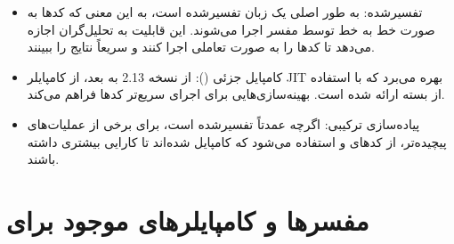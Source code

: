 \documentclass[11pt, a4paper, oneside]{book}
\begin{document}
			\begin{itemize}
				
				\item {\large تفسیرشده}:
				{\normalsize {} به طور اصلی یک زبان تفسیرشده است، به این معنی که کدها به صورت خط به خط توسط مفسر اجرا می‌شوند. این قابلیت به تحلیل‌گران اجازه می‌دهد تا کدها را به صورت تعاملی اجرا کنند و سریعاً نتایج را ببینند.}
				
				\item {\large کامپایل جزئی ()}:
				{\normalsize از نسخه 2.13 به بعد،  از کامپایلر JIT بهره می‌برد که با استفاده از بسته  ارائه شده است.  بهینه‌سازی‌هایی برای اجرای سریع‌تر کدها فراهم می‌کند.
				}
				
				\item {\large پیاده‌سازی ترکیبی}:
				{\normalsize اگرچه  عمدتاً تفسیرشده است، برای برخی از عملیات‌های پیچیده‌تر، از کدهای  و  استفاده می‌شود که کامپایل شده‌اند تا کارایی بیشتری داشته باشند.
				}
			\end{itemize}

		\section{مفسرها و کامپایلرهای موجود برای }
		
\end{document}
